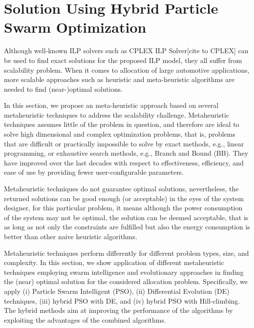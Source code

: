 \section{Solution Using Hybrid Particle Swarm Optimization}
Although well-known ILP solvers such as CPLEX ILP Solver[cite to CPLEX] can be used to find exact solutions for the proposed ILP model, they all suffer from scalability problem. When it comes to allocation of large automotive applications, more scalable approaches such as heuristic and meta-heuristic algorithms are needed to find (near-)optimal solutions. 

In this section, we propose an meta-heuristic approach based on several metaheuristic techniques to address the scalability challenge. Metaheuristic techniques assumes little of the problem in question, and therefore are ideal to solve high dimensional and complex optimization problems, that is, problems that are difficult or practically impossible to solve by exact methods, e.g., linear programming, or exhaustive search methods, e.g., Branch and Bound (BB). They have improved over the last decades with respect to effectiveness, efficiency, and ease of use by providing fewer user-configurable parameters.

Metaheuristic techniques do not guarantee optimal solutions, nevertheless, the returned solutions can be good enough (or acceptable) in the eyes of the system designer, for this particular problem, it means although the power consumption of the system may not be optimal, the solution can be deemed acceptable, that is as long as not only the constraints are fulfilled but also the energy consumption is better than other naive heuristic algorithms. 

Metaheuristic techniques perform differently for different problem types, size, and complexity. In this section, we show application of different metaheuristic techniques employing swarm intelligence and evolutionary approaches in finding the (near) optimal solution for the considered allocation problem.
Specifically, we apply (i) Particle Swarm Intelligent (PSO), (ii) Differential Evolution (DE) techniques, (iii) hybrid PSO with DE, and (iv) hybrid PSO with Hill-climbing. The hybrid methods aim at improving the performance of the algorithms by exploiting the advantages of the combined algorithms. 

